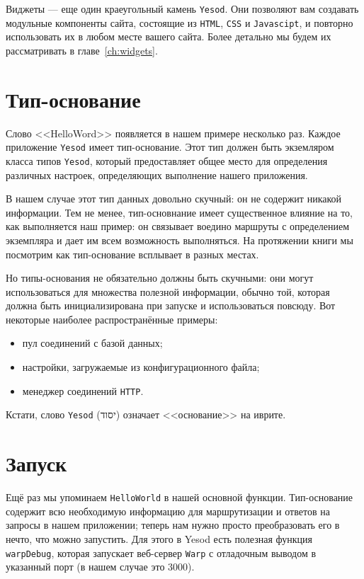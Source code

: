 Виджеты --- еще один краеугольный камень \texttt{Yesod}. Они позволяют вам создавать
модульные компоненты сайта, состоящие из \texttt{HTML}, \texttt{CSS} и \texttt{Javascipt},
и повторно использовать их в любом месте вашего сайта. Более детально мы будем их
рассматривать в главе~\ref{ch:widgets}.

\section{Тип-основание}

Слово <<HelloWord>> появляется в нашем примере несколько раз. Каждое приложение
\texttt{Yesod} имеет тип-основание. Этот тип должен быть экземляром класса типов
\texttt{Yesod}, который предоставляет общее место для определения различных настроек,
определяющих выполнение нашего приложения.

В нашем случае этот тип данных довольно скучный: он не содержит никакой
информации. Тем не менее, тип-основнание имеет существенное влияние на то, как выполняется
наш пример: он связывает воедино маршруты с определением экземпляра и дает им всем
возможность выполняться. На протяжении книги мы посмотрим как тип-основание всплывает в
разных местах.

Но типы-основания не обязательно должны быть скучными: они могут использоваться для
множества полезной информации, обычно той, которая должна быть инициализирована при
запуске и использоваться повсюду. Вот некоторые наиболее распространённые примеры:

\begin{itemize}
  \item пул соединений с базой данных;
  \item настройки, загружаемые из конфигурационного файла;
  \item менеджер соединений \texttt{HTTP}.
\end{itemize}

Кстати, слово \texttt{Yesod} (יסוד) означает <<основание>> на иврите.

\section{Запуск}

Ещё раз мы упоминаем \lstinline!HelloWorld! в нашей основной функции. Тип-основание
содержит всю необходимую информацию для маршрутизации и ответов на запросы в нашем
приложении; теперь нам нужно просто преобразовать его в нечто, что можно запустить. Для
этого в Yesod есть полезная функция \lstinline!warpDebug!, которая запускает веб-сервер
\texttt{Warp} с отладочным выводом в указанный порт (в нашем случае это $3000$).

